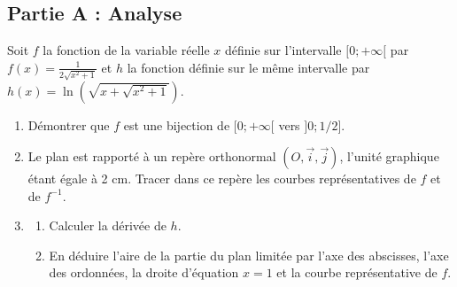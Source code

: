 \subsection*{Partie A : Analyse}
Soit $f$ la fonction de la variable réelle $x$ définie sur l'intervalle $[0;+\infty[$ par $f(x) = \frac{1}{2\sqrt{x^2+1}}$ et $h$ la fonction définie sur le même intervalle par $h(x) = \ln(\sqrt{x+\sqrt{x^2+1}})$.
\begin{enumerate}
	\item Démontrer que $f$ est une bijection de $[0;+\infty[$ vers $]0; 1/2]$.
	\item Le plan est rapporté à un repère orthonormal $(O, \vec{i}, \vec{j})$, l'unité graphique étant égale à 2 cm. Tracer dans ce repère les courbes représentatives de $f$ et de $f^{-1}$.
	\item \begin{enumerate}
		\item Calculer la dérivée de $h$.
		\item En déduire l'aire de la partie du plan limitée par l'axe des abscisses, l'axe des ordonnées, la droite d'équation $x = 1$ et la courbe représentative de $f$.
	\end{enumerate}
\end{enumerate}

